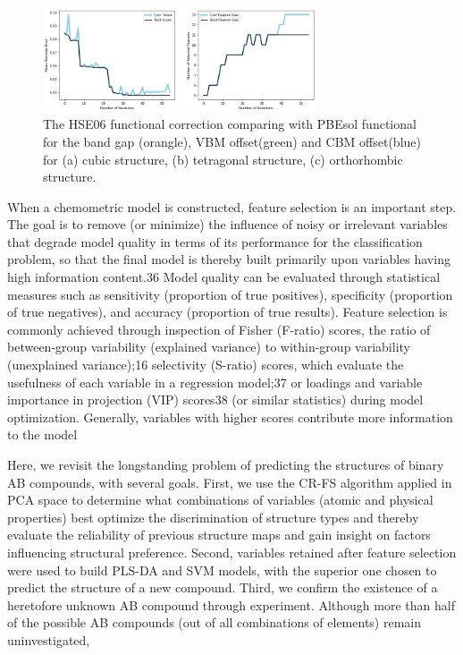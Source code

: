 \documentclass[twocolumn,
superscriptaddress,
 amsmath,amssymb,
 aps, citeautoscript,
prb,
]{revtex4-1}
\begin{document}

\begin{figure}[ht]
\begin{center}
\includegraphics[width=3.2in]{Figures/Fig3.png}
\end{center}
\caption{ The HSE06 functional correction comparing with PBEsol functional for the band gap (orangle), VBM offset(green) and CBM offset(blue) for (a) cubic structure, (b) tetragonal structure, (c) orthorhombic structure. 
}
\label{fig3}
\end{figure}
When a chemometric model is constructed, feature selection is an important step. The goal is to remove (or minimize) the influence of noisy or irrelevant variables that degrade model quality in terms of its performance for the classification problem, so that the final model is thereby built primarily upon variables having high information content.36 Model quality can be evaluated through statistical measures such as sensitivity
(proportion of true positives), specificity (proportion of true
negatives), and accuracy (proportion of true results). Feature
selection is commonly achieved through inspection of Fisher
(F-ratio) scores, the ratio of between-group variability
(explained variance) to within-group variability (unexplained
variance);16 selectivity (S-ratio) scores, which evaluate the
usefulness of each variable in a regression model;37 or loadings
and variable importance in projection (VIP) scores38 (or similar
statistics) during model optimization. Generally, variables with
higher scores contribute more information to the model

Here, we revisit the longstanding problem of predicting the
structures of binary AB compounds, with several goals. First, we
use the CR-FS algorithm applied in PCA space to determine
what combinations of variables (atomic and physical properties) best optimize the discrimination of structure types and
thereby evaluate the reliability of previous structure maps and
gain insight on factors influencing structural preference.
Second, variables retained after feature selection were used to
build PLS-DA and SVM models, with the superior one chosen
to predict the structure of a new compound. Third, we confirm
the existence of a heretofore unknown AB compound through
experiment. Although more than half of the possible AB
compounds (out of all combinations of elements) remain
uninvestigated,
\end{document}

